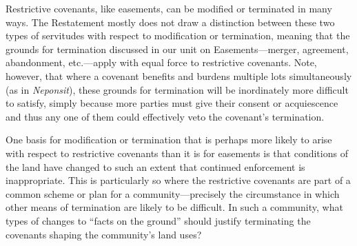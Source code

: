 Restrictive covenants, like easements, can be modified or terminated in many
ways. The Restatement mostly does not draw a distinction between these two types
of servitudes with respect to modification or termination, meaning that the
grounds for termination discussed in our unit on Easements---merger, agreement,
abandonment, etc.---apply with equal force to restrictive covenants. Note,
however, that where a covenant benefits and burdens multiple lots simultaneously
(as in \textit{Neponsit}), these grounds for termination will be inordinately
more difficult to satisfy, simply because more parties must give their consent
or acquiescence and thus any one of them could effectively veto the covenant's
termination.

One basis for modification or termination that is perhaps more likely to arise
with respect to restrictive covenants than it is for easements is that
conditions of the land have changed to such an extent that continued enforcement
is inappropriate. This is particularly so where the restrictive covenants are
part of a common scheme or plan for a community---precisely the circumstance in
which other means of termination are likely to be difficult. In such a
community, what types of changes to ``facts on the ground'' should justify
terminating the covenants shaping the community's land uses?

